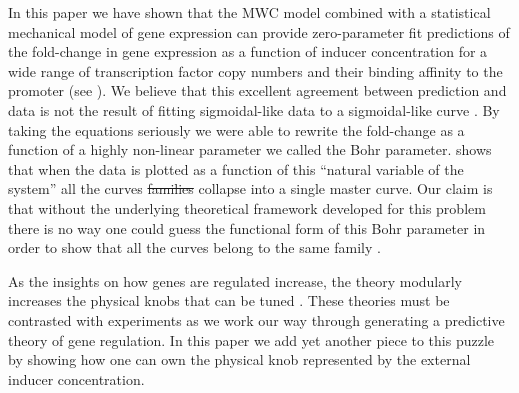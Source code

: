 In this paper we have shown that  the MWC model combined with a statistical
mechanical model of gene expression can provide zero-parameter fit predictions
of the fold-change in gene expression as a function of inducer concentration for
a wide range of transcription factor copy numbers and their binding affinity to
the promoter (see ). We believe that this excellent agreement between
prediction and data is not the result of fitting sigmoidal-like data to a
sigmoidal-like curve  . By taking the equations seriously we were able to rewrite
the fold-change as a function of a highly non-linear parameter we called the
Bohr parameter.  shows that when the data is plotted as a function of this
``natural variable of the system''  all the curves \sout{families} collapse into a
single master curve. Our claim is that without the underlying theoretical
framework developed for this problem there is no way one could guess the
functional form of this Bohr parameter in order to show that all the curves
belong to the same family .

 As the insights on how genes are regulated increase, the theory modularly
increases the physical knobs that can be tuned . These theories must be
contrasted with experiments as we work our way through generating a predictive
theory of gene regulation. In this paper we add yet another piece to this puzzle
by showing how one can own the physical knob represented by the external inducer
concentration. 
